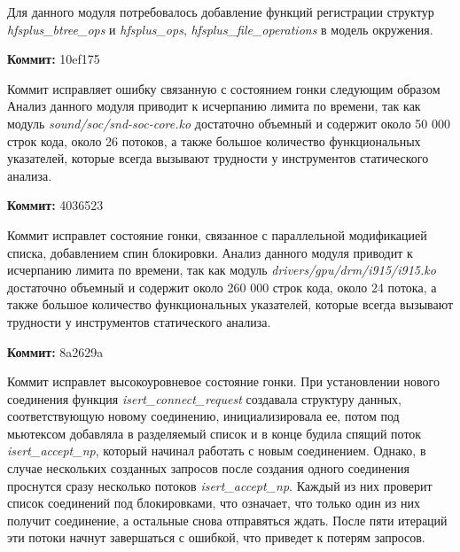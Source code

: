 Для данного модуля потребовалось добавление функций регистрации структур \textit{hfsplus\_btree\_ops} и \textit{hfsplus\_ops}, \textit{hfsplus\_file\_operations} в модель окружения.

\vspace{1cm}

\textbf{Коммит:} 10ef175

Коммит исправляет ошибку связанную с состоянием гонки следующим образом
Анализ данного модуля приводит к исчерпанию лимита по времени, так как модуль \textit{sound/soc/snd-soc-core.ko} достаточно объемный и содержит около 50 000 строк кода, около 26 потоков, а также большое количество функциональных указателей, которые всегда вызывают трудности у инструментов статического анализа.

\vspace{1cm}

\textbf{Коммит:} 4036523

Коммит исправлет состояние гонки, связанное с параллельной модификацией списка, добавлением спин блокировки.
Анализ данного модуля приводит к исчерпанию лимита по времени, так как модуль \textit{drivers/gpu/drm/i915/i915.ko} достаточно объемный и содержит около 260 000 строк кода, около 24 потока, а также большое количество функциональных указателей, которые всегда вызывают трудности у инструментов статического анализа.

\vspace{1cm}

\textbf{Коммит:} 8a2629a

Коммит исправлет высокоуровневое состояние гонки.
При установлении нового соединения функция \textit{isert\_connect\_request} создавала структуру данных, соответствующую новому соединению, инициализировала ее, потом под мьютексом добавляла в разделяемый список и в конце будила спящий поток \textit{isert\_accept\_np}, который начинал работать с новым соединением.
Однако, в случае нескольких созданных запросов после создания одного соединения проснутся сразу несколько потоков \textit{isert\_accept\_np}.
Каждый из них проверит список соединений под блокировками, что означает, что только один из них получит соединение, а остальные снова отправяться ждать. 
После пяти итераций эти потоки начнут завершаться с ошибкой, что приведет к потерям запросов.

